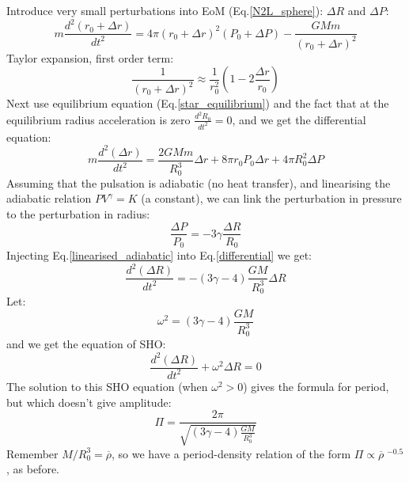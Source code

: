 \documentclass{spy}
\begin{document}
Introduce very small perturbations into EoM (Eq.\ref{N2L_sphere}): \(\Delta R\) and \(\Delta P\): 
\begin{equation}
      m\frac{d^2(r_\mathrm{0} + \Delta r)}{dt^2} = 4 \pi (r_\mathrm{0} + \Delta r)^2 (P_\mathrm{0} + \Delta P) - \frac{GMm}{(r_\mathrm{0} + \Delta r)^2}
\end{equation}
Taylor expansion, first order term:
\begin{equation}
      \frac{1}{(r_\mathrm{0} + \Delta r)^2} \approx \frac{1}{r_\mathrm{0}^2}(1 - 2 \frac{\Delta r}{r_\mathrm{0}})
\end{equation}
Next use equilibrium equation (Eq.\ref{star_equilibrium}) and the fact that at the equilibrium radius acceleration is zero \(\frac{d^2R_\mathrm{0}}{dt^2} = 0\), and we get the differential equation:
\begin{equation}
      m\frac{d^2(\Delta r)}{dt^2} = \frac{2GMm}{R^3_\mathrm{0}}\Delta r + 8\pi r_\mathrm{0} P_\mathrm{0} \Delta r + 4\pi R^2_\mathrm{0} \Delta P
      \label{differential}
\end{equation}
Assuming that the pulsation is adiabatic (no heat transfer), and linearising the adiabatic relation \(PV^\gamma = K\) (a constant), we can link the perturbation in pressure to the perturbation in radius:
\begin{equation}
      \frac{\Delta P }{P_\mathrm{0}} = -3 \gamma \frac{\Delta R}{R_\mathrm{0}}
      \label{linearised_adiabatic}
\end{equation}
Injecting Eq.\ref{linearised_adiabatic} into Eq.\ref{differential} we get:
\begin{equation}
      \frac{d^2(\Delta R)}{dt^2} = -(3\gamma - 4)\frac{GM}{R^3_\mathrm{0}} \Delta R
\end{equation}
Let:
\begin{equation}
      \omega^2 = (3\gamma - 4)\frac{GM}{R^3_\mathrm{0}}
\end{equation}
and we get the equation of SHO:
\begin{equation}
      \frac{d^2(\Delta R)}{dt^2} + \omega^2 \Delta R = 0
\end{equation}
The solution to this SHO equation (when \(\omega^2 > 0\)) gives the formula for period, but which doesn't give amplitude:
\begin{equation}
    \Pi = \frac{2\pi}{\sqrt{(3\gamma - 4)\frac{GM}{R^3_\mathrm{0}}}}
\end{equation}
Remember \(M/R^3_\mathrm{0} = \overline{\rho}\), so we have a period-density relation of the form \(\Pi \propto \overline{\rho} \; ^{-0.5}\), as before. 
\end{document}
